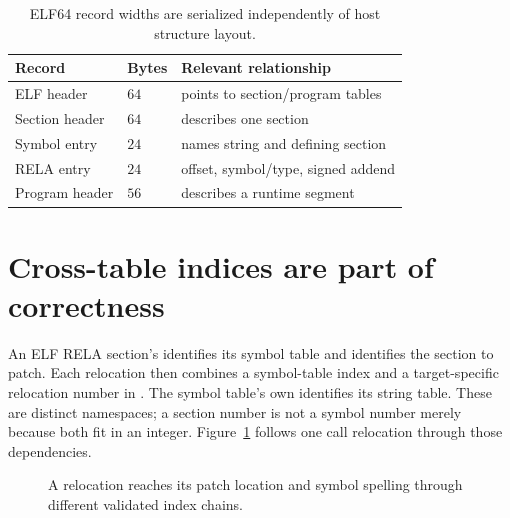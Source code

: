 \begin{table}[htbp]
\caption{ELF64 record widths are serialized independently of host structure layout.}
\label{tab:ch54-records}
\centering
\begin{tabular}{lll}
\toprule
Record & Bytes & Relevant relationship \\
\midrule
ELF header & $64$ & points to section/program tables \\
Section header & $64$ & describes one section \\
Symbol entry & $24$ & names string and defining section \\
RELA entry & $24$ & offset, symbol/type, signed addend \\
Program header & $56$ & describes a runtime segment \\
\bottomrule
\end{tabular}
\end{table}

\section{Cross-table indices are part of correctness}
\label{sec:ch54-indices}

An ELF RELA section's  identifies its symbol table and  identifies the section to patch.
Each relocation then combines a symbol-table index and a target-specific relocation number in .
The symbol table's own  identifies its string table.
These are distinct namespaces; a section number is not a symbol number merely because both fit in an integer.
Figure~\ref{fig:ch54-indices} follows one call relocation through those dependencies.

\begin{figure}[htbp]
\centering
{}
\caption{A relocation reaches its patch location and symbol spelling through different validated index chains.}
\label{fig:ch54-indices}
\end{figure}

